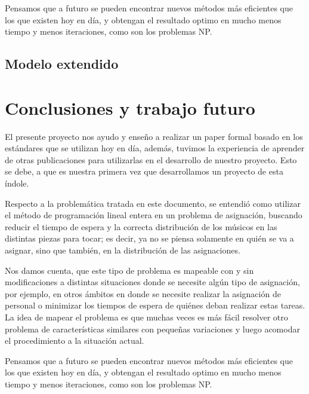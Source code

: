 \documentclass[journal, 10pt]{IEEEtran}
\begin{document}
Pensamos que a futuro se pueden encontrar nuevos métodos más eficientes que los que existen hoy en día, y obtengan el resultado optimo en mucho menos tiempo y menos iteraciones, como son los problemas NP.


\subsection{Modelo extendido}



\section{Conclusiones y trabajo futuro}

El presente proyecto nos ayudo y enseño a realizar un paper formal basado en los estándares que se utilizan hoy en día, además, tuvimos la experiencia de aprender de otras publicaciones para utilizarlas en el desarrollo de nuestro proyecto. Esto se debe, a que es nuestra primera vez que desarrollamos un proyecto de esta índole.

Respecto a la problemática tratada en este documento, se entendió como utilizar el método de programación lineal entera en un problema de asignación, buscando reducir el tiempo de espera y la correcta distribución de los músicos en las distintas piezas para tocar; es decir, ya no se piensa solamente en quién se va a asignar, sino que también, en la distribución de las asignaciones.

Nos damos cuenta, que este tipo de problema es mapeable con y sin modificaciones a distintas situaciones donde se necesite algún tipo de asignación, por ejemplo, en otros ámbitos en donde se necesite realizar la asignación de personal o minimizar los tiempos de espera de quiénes deban realizar estas tareas. La idea de mapear el problema es que muchas veces es más fácil resolver otro problema de características similares con pequeñas variaciones y luego acomodar el procedimiento a la situación actual.

Pensamos que a futuro se pueden encontrar nuevos métodos más eficientes que los que existen hoy en día, y obtengan el resultado optimo en mucho menos tiempo y menos iteraciones, como son los problemas NP.




\end{document}
